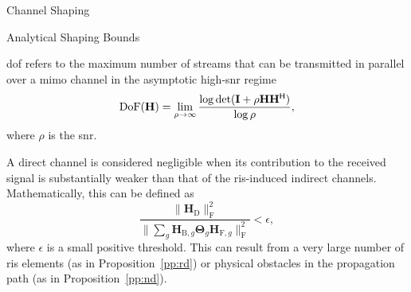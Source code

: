 \documentclass[journal]{IEEEtran}
\begin{document}
\begin{section}{Channel Shaping}
	\begin{subsection}{Analytical Shaping Bounds}
		\label{sc:shaping_analytical}
		\begin{definition}
			\gls{dof} refers to the maximum number of streams that can be transmitted in parallel over a \gls{mimo} channel in the asymptotic high-\gls{snr} regime
			\begin{equation}
				\textnormal{DoF}(\mathbf{H}) = \lim_{\rho \to \infty} \frac{\log \det(\mathbf{I} + \rho \mathbf{H} \mathbf{H}^\mathsf{H})}{\log \rho},
			\end{equation}
			where $\rho$ is the \gls{snr}.
		\end{definition}

		\begin{definition}
			A direct channel is considered negligible when its contribution to the received signal is substantially weaker than that of the \gls{ris}-induced indirect channels. Mathematically, this can be defined as
			\begin{equation*}
				\frac{\lVert \mathbf{H}_\mathrm{D} \rVert _\mathrm{F}^2}{\lVert \sum_g \mathbf{H}_{\mathrm{B},g} \mathbf{\Theta}_g \mathbf{H}_{\mathrm{F},g} \rVert _\mathrm{F}^2} < \epsilon,
			\end{equation*}
			where $\epsilon$ is a small positive threshold.
			This can result from a very large number of \gls{ris} elements (as in Proposition~\ref{pp:rd}) or physical obstacles in the propagation path (as in Proposition~\ref{pp:nd}).

		\end{definition}


\end{subsection}
\end{section}
\end{document}
